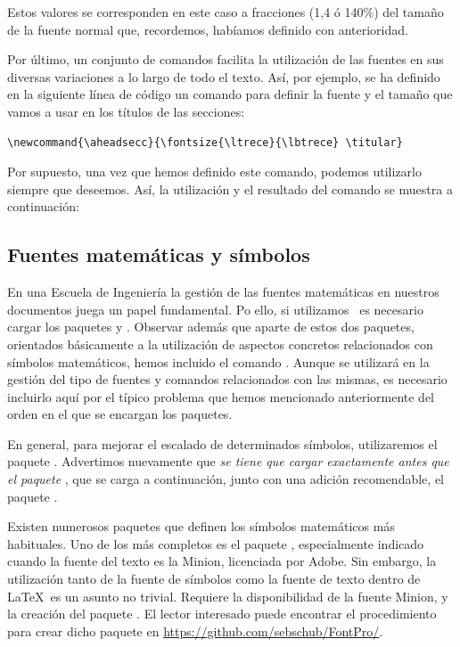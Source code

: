 Estos valores se corresponden  en este caso a fracciones (1,4 ó 140\%) del tamaño de la fuente normal que, recordemos, habíamos definido con anterioridad.

Por último, un conjunto de comandos facilita la utilización de las fuentes en sus diversas variaciones a lo largo de todo el texto. Así, por ejemplo, se ha definido en la siguiente línea de código un comando para definir la fuente y el tamaño que vamos a usar en los títulos de las secciones:
\begin{lstlisting}[frame=none]
\newcommand{\aheadsecc}{\fontsize{\ltrece}{\lbtrece} \titular}
\end{lstlisting}

Por supuesto, una vez que hemos definido este comando, podemos utilizarlo siempre que deseemos. Así, la utilización y el resultado del comando  se muestra a continuación:

\subsection{Fuentes matemáticas y símbolos}
En una Escuela de Ingeniería la gestión de las fuentes matemáticas en nuestros documentos juega un papel fundamental. Po ello, si utilizamos \LuaLaTeX\ es necesario cargar los paquetes  y . Observar además que aparte de estos dos paquetes, orientados básicamente a la utilización de aspectos concretos relacionados con símbolos matemáticos, hemos incluido el comando . Aunque  se utilizará en la gestión del tipo de fuentes y comandos relacionados con las mismas, es necesario incluirlo aquí por el típico problema que hemos mencionado anteriormente del orden en el que se encargan los paquetes.

En general, para mejorar el escalado de determinados símbolos, utilizaremos el paquete . Advertimos nuevamente que \emph{se tiene que cargar exactamente antes que el paquete }, que se carga a continuación, junto con una adición recomendable, el paquete .

Existen numerosos paquetes que definen los símbolos matemáticos más habituales. Uno de los más completos es el paquete , especialmente indicado cuando la fuente del texto es la Minion, licenciada por Adobe. Sin embargo, la utilización tanto de la fuente de símbolos como la fuente de texto dentro de \LaTeX\ es un asunto no trivial. Requiere la disponibilidad de la fuente Minion, y la creación del  paquete . El lector interesado puede encontrar el procedimiento para crear dicho paquete en \url{https://github.com/sebschub/FontPro/}.

